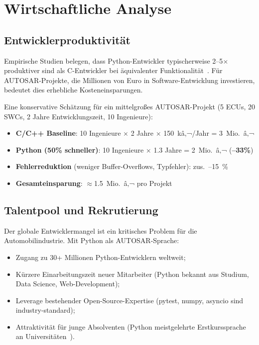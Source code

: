 ﻿\documentclass[12pt,a4paper,twoside]{article}
\begin{document}
\section{Wirtschaftliche Analyse}
\label{sec:wirtschaft}

\subsection{Entwicklerproduktivität}
\label{subsec:produktivitaet}

Empirische Studien belegen, dass Python-Entwickler
typischerweise 2--5$\times$ produktiver sind als C-Entwickler
bei äquivalenter Funktionalität~\cite{prechelt2000productivity, lutz2013learning}.
Für AUTOSAR-Projekte, die Millionen von Euro in Software-Entwicklung
investieren, bedeutet dies erhebliche Kosteneinsparungen.

Eine konservative Schätzung für ein mittelgroßes AUTOSAR-Projekt
(5 ECUs, 20 SWCs, 2 Jahre Entwicklungszeit, 10 Ingenieure):
\begin{itemize}
  \item \textbf{C/C++ Baseline}: 10 Ingenieure $\times$ 2 Jahre $\times$ 150~kâ‚¬/Jahr = 3~Mio.\ â‚¬
  \item \textbf{Python (50\% schneller)}: 10 Ingenieure $\times$ 1.3 Jahre = 2~Mio.\ â‚¬ (\textbf{--33\%})
  \item \textbf{Fehlerreduktion} (weniger Buffer-Overflows, Typfehler): zus.\ --15~\%
  \item \textbf{Gesamteinsparung}: $\approx$1.5~Mio.\ â‚¬ pro Projekt
\end{itemize}

\subsection{Talentpool und Rekrutierung}
\label{subsec:talentpool}

Der globale Entwicklermangel ist ein kritisches Problem für die Automobilindustrie.
Mit Python als AUTOSAR-Sprache:
\begin{itemize}
  \item Zugang zu 30+ Millionen Python-Entwicklern weltweit;
  \item Kürzere Einarbeitungszeit neuer Mitarbeiter (Python bekannt aus
        Studium, Data Science, Web-Development);
  \item Leverage bestehender Open-Source-Expertise
        (pytest, numpy, asyncio sind industry-standard);
  \item Attraktivität für junge Absolventen (Python meistgelehrte
        Erstkurssprache an Universitäten~\cite{python_courses2023}).
\end{itemize}
\end{document}
